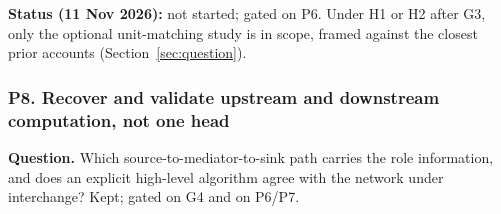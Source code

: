 \documentclass[10pt,a4paper]{article}
\begin{document}
\textbf{Status (11 Nov 2026):} not started; gated on P6. Under H1 or H2 after G3, only the optional
unit-matching study is in scope, framed against the closest prior accounts (Section~\ref{sec:question}).

\subsubsection{P8. Recover and validate upstream and downstream computation, not one head}
\label{sec:blockP8}

\textbf{Question.} Which source-to-mediator-to-sink path carries the role information, and does an explicit
high-level algorithm agree with the network under interchange? Kept; gated on G4 and on P6/P7.
\end{document}
